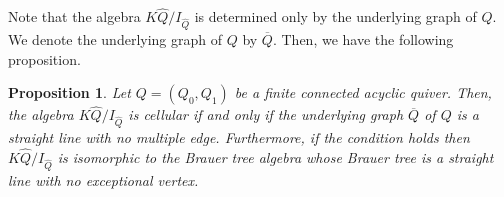 \documentclass[12pt]{amsart}
\newtheorem{prop}[thm]{Proposition}
\numberwithin{equation}{thm}
\newcommand\wh{\widehat}
\newcommand\ol{\overline}
\newcounter{ni}
\begin{document}

Note that the algebra $K \wh{Q}/ I_{\wh{Q}}$ is determined only by the underlying graph of $Q$. 
We denote the underlying graph of $Q$ by $\ol{Q}$. 
Then, we have the following proposition. 


\begin{prop} 
\label{F Prop hatQ hatI}
Let $Q=(Q_0,Q_1)$ be a finite connected acyclic quiver. 
Then, 
the algebra 
$K \wh{Q}/ I_{\wh{Q}}$ is cellular 
if and only if 
the underlying graph $\ol{Q}$ of $Q$ is a straight line with no multiple edge.
Furthermore, if the condition holds then
$K \wh{Q}/ I_{\wh{Q}}$ is isomorphic to the Brauer tree algebra whose
Brauer tree is a straight line with no exceptional vertex.
\end{prop}
\end{document}
